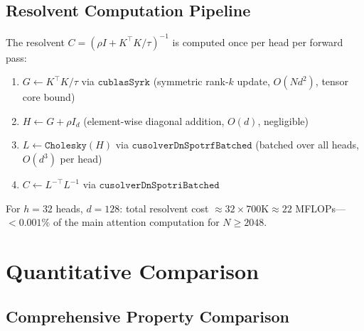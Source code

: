 \documentclass[11pt,a4paper]{article}
\theoremstyle{remark}
\begin{document}
\subsection{Resolvent Computation Pipeline}

The resolvent $C = (\rho I + K^\top K/\tau)^{-1}$ is computed once per head per forward pass:

\begin{enumerate}[leftmargin=*]
    \item $G \gets K^\top K / \tau$ via $\texttt{cublasSyrk}$ (symmetric rank-$k$ update, $O(Nd^2)$, tensor core bound)
    \item $H \gets G + \rho I_d$ (element-wise diagonal addition, $O(d)$, negligible)
    \item $L \gets \texttt{Cholesky}(H)$ via $\texttt{cusolverDnSpotrfBatched}$ (batched over all heads, $O(d^3)$ per head)
    \item $C \gets L^{-\top} L^{-1}$ via $\texttt{cusolverDnSpotriBatched}$
\end{enumerate}

For $h = 32$ heads, $d = 128$: total resolvent cost $\approx 32 \times 700\text{K} \approx 22$ MFLOPs---$<0.001\%$ of the main attention computation for $N \geq 2048$.

\section{Quantitative Comparison}
\label{sec:comparison}

\subsection{Comprehensive Property Comparison}
\end{document}
